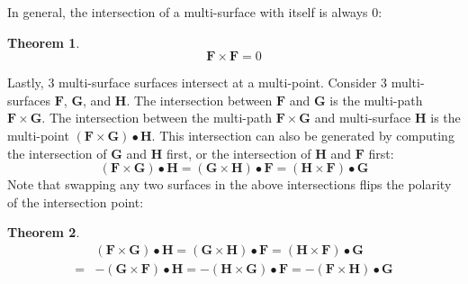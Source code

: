\documentclass{book}
\newtheorem{thm}{Theorem}
\begin{document}
In general, the intersection of a multi-surface with itself is always \(0\):

\begin{thm}
\[\mathbf{F} \times \mathbf{F} = 0\]
\end{thm}


Lastly, 3 multi-surface surfaces intersect at a multi-point. Consider \(3\) multi-surfaces \(\mathbf{F}\), \(\mathbf{G}\), and \(\mathbf{H}\). The intersection between \(\mathbf{F}\) and \(\mathbf{G}\) is the multi-path \(\mathbf{F} \times \mathbf{G}\). The intersection between the multi-path \(\mathbf{F} \times \mathbf{G}\) and multi-surface \(\mathbf{H}\) is the multi-point \((\mathbf{F} \times \mathbf{G}) \bullet \mathbf{H}\). This intersection can also be generated by computing the intersection of \(\mathbf{G}\) and \(\mathbf{H}\) first, or the intersection of \(\mathbf{H}\) and \(\mathbf{F}\) first:
\[(\mathbf{F} \times \mathbf{G}) \bullet \mathbf{H} = (\mathbf{G} \times \mathbf{H}) \bullet \mathbf{F} = (\mathbf{H} \times \mathbf{F}) \bullet \mathbf{G}\]
Note that swapping any two surfaces in the above intersections flips the polarity of the intersection point:
\begin{thm}
\begin{align*}
& (\mathbf{F} \times \mathbf{G}) \bullet \mathbf{H} = (\mathbf{G} \times \mathbf{H}) \bullet \mathbf{F} = (\mathbf{H} \times \mathbf{F}) \bullet \mathbf{G} \\ 
= & -(\mathbf{G} \times \mathbf{F}) \bullet \mathbf{H} = -(\mathbf{H} \times \mathbf{G}) \bullet \mathbf{F} = -(\mathbf{F} \times \mathbf{H}) \bullet \mathbf{G}
\end{align*}
\end{thm}
\end{document}
